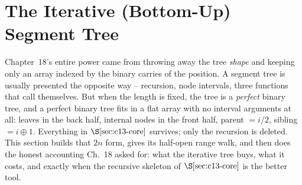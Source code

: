 \section{The Iterative (Bottom-Up) Segment Tree}\label{sec:c13-iter}

\begin{previouslybox}
Chapter~18's entire power came from throwing away the tree \emph{shape} and
keeping only an array indexed by the binary carries of the position.  A segment
tree is usually presented the opposite way -- recursion, node intervals, three
functions that call themselves.  But when the length is fixed, the tree is a
\emph{perfect} binary tree, and a perfect binary tree fits in a flat array with
no interval arguments at all: leaves in the back half, internal nodes in the
front half, parent \(= i/2\), sibling \(= i \oplus 1\).  Everything in
\(\secref{c13-core}\) survives; only the recursion is deleted.  This section
builds that \(2n\) form, gives its half-open range walk, and then does the
honest accounting Ch.~18 asked for: what the iterative tree buys, what it costs,
and exactly when the recursive skeleton of \(\secref{c13-core}\) is the better
tool.
\end{previouslybox}


